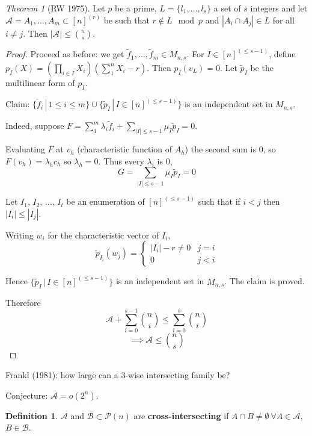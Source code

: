 \documentclass[a4paper]{article}
\theoremstyle{definition}
\newtheorem*{definition}{Definition}
\theoremstyle{remark}
\theoremstyle{default}
\newtheorem{theorem}{Theorem}
\newcommand*\abs[1]{\left|#1\right|}
\begin{document}
\begin{theorem}[RW 1975]
	Let $p$ be a prime,
	$L = \{l_1, \dots, l_s\}$ a set of $s$ integers
	and let $\mathcal{A} = {A_1, \dots, A_m} \subset [n]^{(r)}$ be such that $r \not\in L \mod p$
	and $\abs{A_i \cap A_j} \in L$ for all $i \neq j$.
	Then $\abs{\mathcal{A}} \leq {n \choose s}$.
\end{theorem}
\begin{proof}
	Proceed as before:
	we get $\tilde{f}_1, \dots, \tilde{f}_m \in M_{n,s}$.
	For $I \in [n]^{(\leq s-1)}$,
	define $p_I(X) = (\prod_{i \in I} X_i)(\sum_1^n X_i -r)$.
	Then $p_I(v_L) = 0$.
	Let $\tilde{p}_I$ be the multilinear form of $p_I$.
	
	Claim: $\{\tilde{f}_i \,|\, 1 \leq i \leq m \} \cup \{\tilde{p}_I \,|\, I \in [n]^{(\leq s-1)}\}$
	is an independent set in $M_{n,s}$.
	
	Indeed, suppose $F=\sum_1^m \lambda_i \tilde{f}_i + \sum_{\abs{I}\leq s-1} \mu_I \tilde{p}_I = 0$.
	
	Evaluating $F$ at $v_h$ (characteristic function of $A_h$)
	the second sum is 0,
	so $F(v_h) = \lambda_h c_h$ so $\lambda_h =0$.
	Thus every $\lambda_i$ is 0,
	$$G = \sum_{\abs{I} \leq s-1} \mu_I \tilde{p}_I = 0$$
	
	Let $I_1,\, I_2,\, \dots,\, I_t$ be an enumeration of $[n]^{(\leq s-1)}$ such that if $i<j$ then $\abs{I_i} \leq \abs{I_j}$.
	
	Writing $w_i$ for the characteristic vector of $I_i$,
	$$\tilde{p}_{I_i}(w_j) = \begin{cases}
		\abs{I_i}-r \neq 0 & j=i \\
		0 & j<i
	\end{cases}$$
	
	Hence $\{\tilde{p}_I \,|\, I \in [n]^{(\leq s-1)} \}$ is an independent set in $M_{n,s}$.
	The claim is proved.
	
	Therefore
	$$\mathcal{A} + \sum_{i=0}^{s-1}{n \choose i} \leq \sum_{i=0}^s {n \choose i}$$
	$$\implies \mathcal{A} \leq {n \choose s}$$
\end{proof}

Frankl (1981): how large can a 3-wise intersecting family be?

Conjecture: $\mathcal{A} = o(2^n)$.

\begin{definition}
	$\mathcal{A}$ and $\mathcal{B} \subset \mathcal{P}(n)$ are \textbf{cross-intersecting} if
	$A \cap B \neq \emptyset\ \forall A \in \mathcal{A}$, $B \in \mathcal{B}$.
\end{definition}
\end{document}
